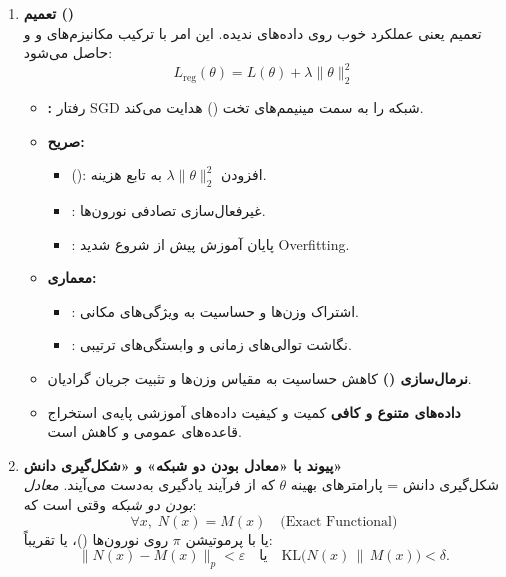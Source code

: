 \begin{enumerate}
\begin{enumerate}
		\item \textbf{تعمیم ()}\\
		تعمیم یعنی عملکرد خوب روی داده‌های ندیده. این امر با ترکیب مکانیزم‌های  و  و  حاصل می‌شود:
		\[
		L_{\text{reg}}(\theta) = L(\theta) + \lambda \|\theta\|_2^2
		\]
		\begin{itemize}
			\item \textbf{:} رفتار SGD شبکه را به سمت مینیمم‌های تخت () هدایت می‌کند.
			\item \textbf{ صریح:}
			\begin{itemize}
				\item {} (): افزودن \(\lambda\|\theta\|_2^2\) به تابع هزینه.
				\item {}: غیرفعال‌سازی تصادفی نورون‌ها.
				\item {}: پایان آموزش پیش از شروع شدید Overfitting.
			\end{itemize}
			\item \textbf{ معماری:}
			\begin{itemize}
				\item {}: اشتراک وزن‌ها و حساسیت به ویژگی‌های مکانی.
				\item {}: نگاشت توالی‌های زمانی و وابستگی‌های ترتیبی.
			\end{itemize}
			\item \textbf{نرمال‌سازی ()}  
			کاهش حساسیت به مقیاس وزن‌ها و تثبیت جریان گرادیان.
			\item \textbf{داده‌های متنوع و کافی}  
			کمیت و کیفیت داده‌های آموزشی پایه‌ی استخراج قاعده‌های عمومی و کاهش  است.
		\end{itemize}
		
		\item \textbf{پیوند با «معادل بودن دو شبکه» و «شکل‌گیری دانش»}\\
		شکل‌گیری دانش = پارامترهای بهینه \(\theta\) که از فرآیند یادگیری به‌دست می‌آیند.  
		\emph{معادل بودن دو شبکه} وقتی است که:
		\[
		\forall x,\; N(x) = M(x)
		\quad\text{(Exact Functional)}
		\]
		یا با پرموتیشن \(\pi\) روی نورون‌ها ()، یا تقریباً:
		\[
		\|N(x)-M(x)\|_p < \varepsilon
		\quad\text{یا}\quad
		\mathrm{KL}\bigl(N(x)\,\|\,M(x)\bigr) < \delta.
		\]
	\end{enumerate}
	
	\newpage
	

\end{enumerate}

